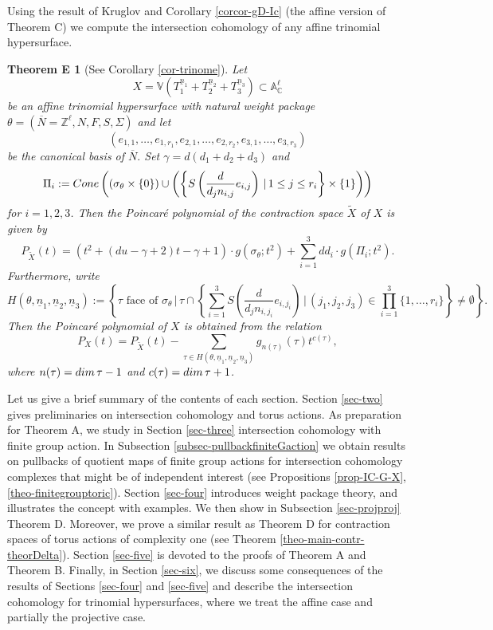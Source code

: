 \documentclass[11pt, reqno]{amsart}
\theoremstyle{plain}
\newtheorem*{thmE}{Theorem E}
\theoremstyle{definition}
\theoremstyle{remark}
\begin{document}
 Using the result of Kruglov \cite[Theorem 3.1]{Kru19} and Corollary \ref{corcor-gD-Ic} (the affine version of Theorem C)  we compute the intersection cohomology of any affine trinomial hypersurface. 
\begin{thmE}[See Corollary \ref{cor-trinome}]\label{TheoD-TheoD}
Let $$X  =  \mathbb{V}(T_{1}^{\underline{n}_{1}} + T_{2}^{\underline{n}_{2}} + T_{3}^{\underline{n}_{3}}) \subset \mathbb{A}_{\mathbb{C}}^{\ell}$$
be an affine trinomial hypersurface with natural weight package $\theta =  (\overline{N} =  \mathbb{Z}^{\ell}, N, F, S, \Sigma)$ and let $$(e_{1,1}, \ldots, e_{1, r_{1}}, e_{2, 1}, \ldots, e_{2, r_{2}}, e_{3,1}, \ldots, e_{3, r_{3}})$$ be 
the canonical basis of $\overline{N}.$
Set  $\gamma =  d(d_{1} + d_{2} + d_{3})$
and $$\Pi_{i} := {\rm Cone}\left( (\sigma_{\theta}\times \{0\})\cup \left(\left\{ S\left( \frac{d}{d_{j} n_{i,j}}e_{i,j}\right)\,|\, 1\leq j\leq r_{i}\right\}\times\{1\}\right)\right)$$
for $i = 1, 2, 3$. Then the Poincar\'e polynomial of the contraction space $\widetilde{X}$ of $X$ is given by
$$P_{\widetilde{X}}(t) =  \left(t^{2} + (du - \gamma + 2)t - \gamma + 1\right)\cdot g(\sigma_{\theta}; t^{2}) +  \sum_{i = 1}^{3} dd_{i}\cdot g(\Pi_{i}; t^{2}).$$   
Furthermore, write 
$$H(\theta, \underline{n}_{1},\underline{n}_{2},\underline{n}_{3}):= \left\{\tau \text{ face of }\sigma_{\theta}\,|\, \tau\cap \left\{\sum_{i =  1}^{3} S\left( \frac{d}{d_{j} n_{i,j_{i}}}e_{i,j_{i}}\right)\,|\, (j_{1}, j_{2}, j_{3})\in \prod_{i = 1}^{3}\{1, \ldots, r_{i}\}\right\} \neq \emptyset\right\}.$$
Then the Poincar\'e polynomial of $X$ is obtained from the relation
$$P_{X}(t)  = P_{\widetilde{X}}(t)  -  \sum_{\tau \in H(\theta, \underline{n}_{1},\underline{n}_{2},\underline{n}_{3})} g_{n(\tau)}(\tau) t^{c(\tau)}, $$
where $n(\tau) =  {\rm dim}\, \tau - 1$ and $c(\tau) =  {\rm dim}\, \tau +1$.      
\end{thmE}
Let us give a brief summary of the contents of each section. Section \ref{sec-two} gives preliminaries  on intersection cohomology
and torus actions. As  preparation for Theorem A, we study  in Section \ref{sec-three} intersection cohomology with finite group action. In Subsection \ref{subsec-pullbackfiniteGaction} we obtain  results  on pullbacks of quotient maps of finite group actions for intersection cohomology complexes that might be of independent interest (see Propositions \ref{prop-IC-G-X}, \ref{theo-finitegrouptoric}). Section \ref{sec-four} introduces weight package theory, and
illustrates the concept with examples.
We then show in Subsection \ref{sec-projproj} Theorem D.
 Moreover, we prove a similar result as Theorem D for contraction spaces of  torus actions of complexity one (see Theorem \ref{theo-main-contr-theorDelta}).  Section \ref{sec-five} is devoted to the proofs of Theorem A and Theorem B.
Finally, in Section \ref{sec-six}, we discuss some
consequences of the results of Sections \ref{sec-four} and \ref{sec-five} and describe the intersection cohomology for trinomial hypersurfaces, where we treat the affine case and partially the projective case. 
\\
\end{document}
